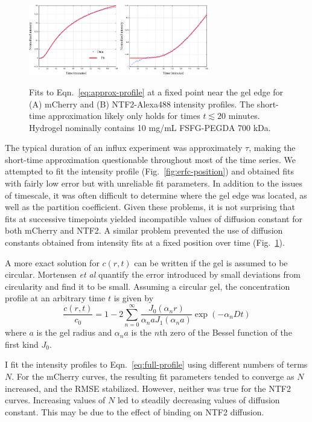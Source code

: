 \begin{figure}
\caption[Fits to concentration profiles at a fixed position.]{Fits to Eqn.~\ref{eq:approx-profile} at a fixed point near the gel edge for (A) mCherry and (B) NTF2-Alexa488 intensity profiles.  The short-time approximation likely only holds for times $t \lesssim 20$ minutes. Hydrogel nominally contains 10 mg/mL FSFG-PEGDA 700 kDa.\\}
\centering
\includegraphics[width=0.7\textwidth]{figs/ch04/erfc-time.pdf}
\label{fig:erfc-time}
\end{figure} 

The typical duration of an influx experiment was approximately $\tau$, making the short-time approximation questionable throughout most of the time series.  We attempted to fit the intensity profile (Fig.~\ref{fig:erfc-position}) and obtained fits with fairly low error but with unreliable fit parameters.  In addition to the issues of timescale, it was often difficult to determine where the gel edge was located, as well as the partition coefficient.  Given these problems, it is not surprising that fits at successive timepoints yielded incompatible values of diffusion constant for both mCherry and NTF2.  A similar problem prevented the use of diffusion constants obtained from intensity fits at a fixed position over time (Fig.~\ref{fig:erfc-time}).

A more exact solution for $c(r,t)$ can be written if the gel is assumed to be circular.  Mortensen \textit{et al} quantify the error introduced by small deviations from circularity and find it to be small.  Assuming a circular gel, the concentration profile at an arbitrary time $t$ is given by
\begin{equation}
\frac{c(r,t)}{c_0} = 1 - 2\sum_{n=0}^\infty \frac{J_0(\alpha_n r)}{\alpha_n a J_1(\alpha_n a)}\exp(-\alpha_n D t)
\label{eq:full-profile}
\end{equation}
where $a$ is the gel radius and $\alpha_n a$ is the $n$th zero of the Bessel function of the first kind $J_0$.

I fit the intensity profiles to Eqn.~\ref{eq:full-profile} using different numbers of terms $N$.  For the mCherry curves, the resulting fit parameters tended to converge as $N$ increased, and the RMSE stabilized.  However, neither was true for the NTF2 curves.  Increasing values of $N$ led to steadily decreasing values of diffusion constant.  This may be due to the effect of binding on NTF2 diffusion.

